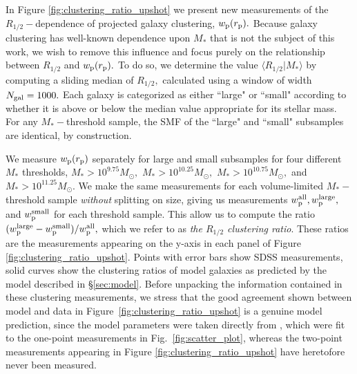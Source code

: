 \documentclass[usenatbib,usegraphicx,letterpaper]{mn2e}
\newcommand{\rhalf}{R_{1/2}}
\newcommand{\mstar}{M_{\ast}}
\newcommand{\rproj}{r_{\rm p}}
\newcommand{\wproj}{w_{\rm p}}
\newcommand{\wplarge}{w_{\rm p}^{\rm large}}
\newcommand{\wpsmall}{w_{\rm p}^{\rm small}}
\newcommand{\wpall}{w_{\rm p}^{\rm all}}
\newcommand{\msun}{M_\odot}
\begin{document}
In Figure \ref{fig:clustering_ratio_upshot} we present new measurements of the $\rhalf-$dependence of projected galaxy clustering, $\wproj(\rproj).$ Because galaxy clustering has well-known dependence upon $\mstar$ that is not the subject of this work, we wish to remove this influence and focus purely on the relationship between $\rhalf$ and $\wproj(\rproj).$ To do so, we determine the value $\langle\rhalf\vert\mstar\rangle$ by computing a sliding median of $\rhalf,$ calculated using a window of width $N_{\rm gal}=1000.$ Each galaxy is categorized as either ``large" or ``small" according to whether it is above or below the median value appropriate for its stellar mass. For any $\mstar-$threshold sample, the SMF of the ``large" and ``small" subsamples are identical, by construction. 

We measure $\wproj(\rproj)$ separately for large and small subsamples for four different $\mstar$ thresholds, $\mstar>10^{9.75}\msun,$ $\mstar>10^{10.25}\msun,$ $\mstar>10^{10.75}\msun,$ and $\mstar>10^{11.25}\msun.$ We make the same measurements for each volume-limited $\mstar-$threshold sample {\em without} splitting on size, giving us measurements $\wpall, \wplarge,$ and $\wpsmall$ for each threshold sample. This allow us to compute the ratio $(\wplarge-\wpsmall)/\wpall,$ which we refer to as {\em the $\rhalf$ clustering ratio}. These ratios are the measurements appearing on the y-axis in each panel of Figure \ref{fig:clustering_ratio_upshot}. Points with error bars show SDSS measurements, solid curves show the clustering ratios of model galaxies as predicted by the model described in \S\ref{sec:model}. Before unpacking the information contained in these clustering measurements, we stress that the good agreement shown between model and data in Figure~\ref{fig:clustering_ratio_upshot} is a genuine model prediction, since the model parameters were taken directly from \citet{kravtsov13}, which were fit to the one-point measurements in Fig.~\ref{fig:scatter_plot}, whereas the two-point measurements appearing in Figure \ref{fig:clustering_ratio_upshot} have heretofore never been measured. 
\end{document}
